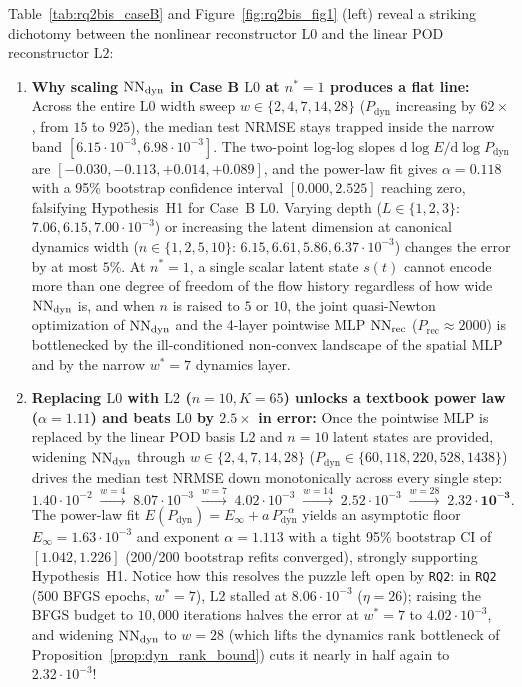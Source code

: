 Table~\ref{tab:rq2bis_caseB} and Figure~\ref{fig:rq2bis_fig1} (left) reveal a striking dichotomy between the nonlinear reconstructor $\mathrm{L0}$ and the linear POD reconstructor $\mathrm{L2}$:
\begin{enumerate}[leftmargin=2em]
  \item \textbf{Why scaling $\mathrm{NN}_{\mathrm{dyn}}$ in Case B $\mathrm{L0}$ at $n^*=1$ produces a flat line:} Across the entire $\mathrm{L0}$ width sweep $w \in \{2, 4, 7, 14, 28\}$ ($P_{\mathrm{dyn}}$ increasing by $62\times$, from $15$ to $925$), the median test NRMSE stays trapped inside the narrow band $[6.15\cdot 10^{-3}, 6.98\cdot 10^{-3}]$. The two-point log-log slopes $\mathrm{d}\log E / \mathrm{d}\log P_{\mathrm{dyn}}$ are $[-0.030, -0.113, +0.014, +0.089]$, and the power-law fit gives $\alpha = 0.118$ with a 95\% bootstrap confidence interval $[0.000, 2.525]$ reaching zero, falsifying Hypothesis~H1 for Case~B $\mathrm{L0}$. Varying depth ($L \in \{1,2,3\}$: $7.06, 6.15, 7.00\cdot 10^{-3}$) or increasing the latent dimension at canonical dynamics width ($n \in \{1,2,5,10\}$: $6.15, 6.61, 5.86, 6.37\cdot 10^{-3}$) changes the error by at most $5\%$. At $n^*=1$, a single scalar latent state $s(t)$ cannot encode more than one degree of freedom of the flow history regardless of how wide $\mathrm{NN}_{\mathrm{dyn}}$ is, and when $n$ is raised to $5$ or $10$, the joint quasi-Newton optimization of $\mathrm{NN}_{\mathrm{dyn}}$ and the 4-layer pointwise MLP $\mathrm{NN}_{\mathrm{rec}}$ ($P_{\mathrm{rec}} \approx 2000$) is bottlenecked by the ill-conditioned non-convex landscape of the spatial MLP and by the narrow $w^*=7$ dynamics layer.
  \item \textbf{Replacing $\mathrm{L0}$ with $\mathrm{L2}$ ($n=10, K=65$) unlocks a textbook power law ($\alpha = 1.11$) and beats $\mathrm{L0}$ by $2.5\times$ in error:} Once the pointwise MLP is replaced by the linear POD basis $\mathrm{L2}$ and $n=10$ latent states are provided, widening $\mathrm{NN}_{\mathrm{dyn}}$ through $w \in \{2, 4, 7, 14, 28\}$ ($P_{\mathrm{dyn}} \in \{60, 118, 220, 528, 1438\}$) drives the median test NRMSE down monotonically across every single step:
  \begin{equation}
    1.40\cdot 10^{-2} \;\xrightarrow{w=4}\; 8.07\cdot 10^{-3} \;\xrightarrow{w=7}\; 4.02\cdot 10^{-3} \;\xrightarrow{w=14}\; 2.52\cdot 10^{-3} \;\xrightarrow{w=28}\; \mathbf{2.32\cdot 10^{-3}}.
    \label{eq:caseB_L2_progression}
  \end{equation}
  The power-law fit $E(P_{\mathrm{dyn}}) = E_\infty + a\,P_{\mathrm{dyn}}^{-\alpha}$ yields an asymptotic floor $E_\infty = 1.63\cdot 10^{-3}$ and exponent $\alpha = 1.113$ with a tight 95\% bootstrap CI of $[1.042, 1.226]$ (200/200 bootstrap refits converged), strongly supporting Hypothesis~H1. Notice how this resolves the puzzle left open by \texttt{RQ2}: in \texttt{RQ2} (500 BFGS epochs, $w^*=7$), $\mathrm{L2}$ stalled at $8.06\cdot 10^{-3}$ ($\eta = 26$); raising the BFGS budget to $10{,}000$ iterations halves the error at $w^*=7$ to $4.02\cdot 10^{-3}$, and widening $\mathrm{NN}_{\mathrm{dyn}}$ to $w=28$ (which lifts the dynamics rank bottleneck of Proposition~\ref{prop:dyn_rank_bound}) cuts it nearly in half again to \textbf{$2.32\cdot 10^{-3}$}!

\end{enumerate}
